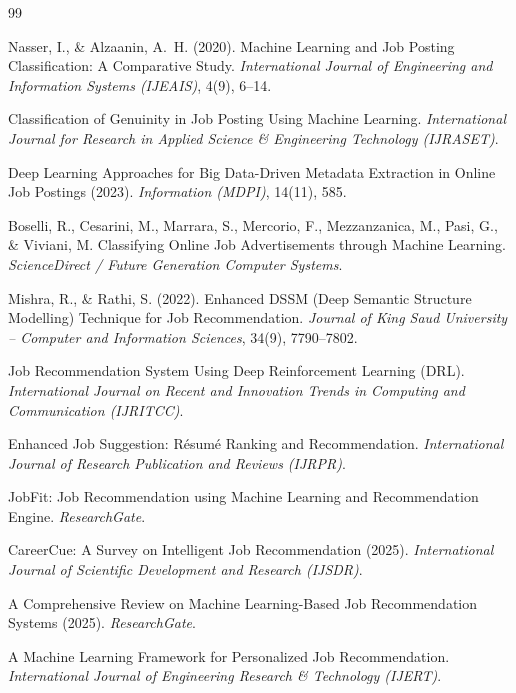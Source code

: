 \documentclass[11pt,a4paper]{article}
\begin{document}
\clearpage
{}
\begin{thebibliography}{99}

 Nasser, I., \& Alzaanin, A.~H. (2020). Machine Learning and Job Posting Classification: A Comparative Study. \textit{International Journal of Engineering and Information Systems (IJEAIS)}, 4(9), 6--14.

 Classification of Genuinity in Job Posting Using Machine Learning. \textit{International Journal for Research in Applied Science \& Engineering Technology (IJRASET)}.

 Deep Learning Approaches for Big Data-Driven Metadata Extraction in Online Job Postings (2023). \textit{Information (MDPI)}, 14(11), 585.

 Boselli, R., Cesarini, M., Marrara, S., Mercorio, F., Mezzanzanica, M., Pasi, G., \& Viviani, M. Classifying Online Job Advertisements through Machine Learning. \textit{ScienceDirect / Future Generation Computer Systems}.

 Mishra, R., \& Rathi, S. (2022). Enhanced DSSM (Deep Semantic Structure Modelling) Technique for Job Recommendation. \textit{Journal of King Saud University -- Computer and Information Sciences}, 34(9), 7790--7802.

 Job Recommendation System Using Deep Reinforcement Learning (DRL). \textit{International Journal on Recent and Innovation Trends in Computing and Communication (IJRITCC)}.

 Enhanced Job Suggestion: R\'esum\'e Ranking and Recommendation. \textit{International Journal of Research Publication and Reviews (IJRPR)}.

 JobFit: Job Recommendation using Machine Learning and Recommendation Engine. \textit{ResearchGate}.

 CareerCue: A Survey on Intelligent Job Recommendation (2025). \textit{International Journal of Scientific Development and Research (IJSDR)}.

 A Comprehensive Review on Machine Learning-Based Job Recommendation Systems (2025). \textit{ResearchGate}.

 A Machine Learning Framework for Personalized Job Recommendation. \textit{International Journal of Engineering Research \& Technology (IJERT)}.

\end{thebibliography}
\end{document}
